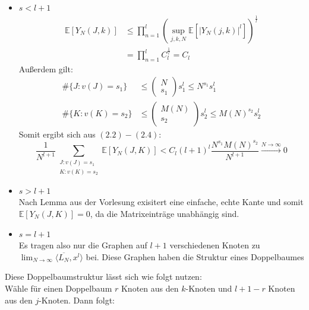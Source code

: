 \documentclass[a4paper, 11pt]{scrreprt}
\newcommand{\EE}{\mathbb{E}}
\begin{document}
\begin{itemize}
	\item \(s < l+ 1\)\\
		\begin{equation}
			\begin{split}
			\EE[Y_N(J,k)] &\leq \prod_{n=1}^l \left(\sup_{j,k,N}\EE\left[|Y_N(j,k)|^l\right]\right)^{\frac 1 l} \\
			& = \prod_{n=1}^l C_l^{\frac 1 l} = C_l
			\end{split}
			\end{equation}
	Außerdem gilt: 
		\begin{align}
			\#\{J: v(J)=s_1\} &\leq \begin{pmatrix} N \\ s_1 \end{pmatrix} s_1^l \leq N^{s_1}s_1^l \\
			\#\{K: v(K)=s_2\} &\leq \begin{pmatrix} M(N) \\ s_2 \end{pmatrix} s_2^l \leq M(N)^{s_2}s_2^l
		\end{align}
	Somit ergibt sich aus \((2.2) - (2.4)\): 
	\begin{equation}
		\frac {1}{N^{l+1}} \sum_{\substack{J:v(J)=s_1\\ K:v(K)=s_2 }} \EE[Y_N(J,K)] < C_l (l+1)^l \frac{N^{s_1} M(N)^{s_2}}{N^{l+1}} \xrightarrow{N\to\infty} 0
	\end{equation}
		
	\item \(s> l+1\) \\
		Nach Lemma aus der Vorlesung exisitert eine einfache, echte Kante und somit \(\EE[Y_N(J,K)]=0\), da die Matrixeinträge unabhängig sind.
	\item \(s=l+1\)\\
		Es tragen also nur die Graphen auf \(l+1\) verschiedenen Knoten zu \(\lim_{N\to\infty} \langle \overline{L_N}, x^l \rangle \) bei. Diese Graphen haben die Struktur eines Doppelbaumes%
\end{itemize}
Diese Doppelbaumstruktur lässt sich wie folgt nutzen:\\
Wähle für einen Doppelbaum \(r\) Knoten aus den \(k\)-Knoten und \(l+1-r\) Knoten aus den \(j\)-Knoten. Dann folgt:
\end{document}
